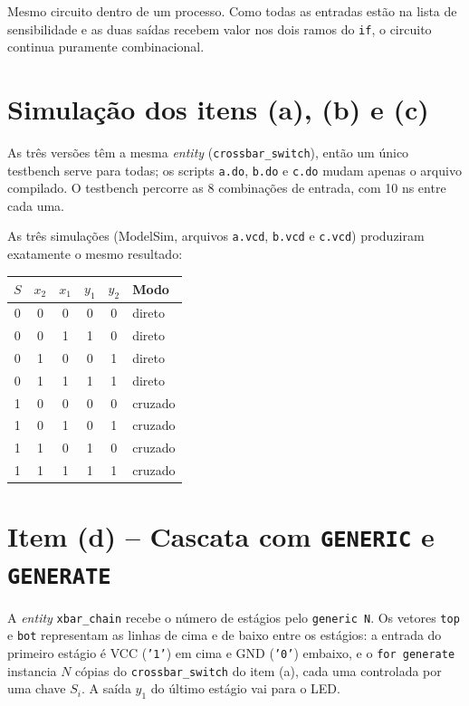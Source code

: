 \documentclass[report, 12pt]{uftreport}
\begin{document}
Mesmo circuito dentro de um processo. Como todas as entradas estão na lista de sensibilidade e as duas saídas recebem valor nos dois ramos do \texttt{if}, o circuito continua puramente combinacional.



\section{Simulação dos itens (a), (b) e (c)}

As três versões têm a mesma \textit{entity} (\texttt{crossbar\_switch}), então um único testbench serve para todas; os scripts \texttt{a.do}, \texttt{b.do} e \texttt{c.do} mudam apenas o arquivo compilado. O testbench percorre as 8 combinações de entrada, com 10 ns entre cada uma.



As três simulações (ModelSim, arquivos \texttt{a.vcd}, \texttt{b.vcd} e \texttt{c.vcd}) produziram exatamente o mesmo resultado:

\begin{center}
\begin{tabular}{ccc|cc|l}
\toprule
$S$ & $x_2$ & $x_1$ & $y_1$ & $y_2$ & Modo \\
\midrule
0 & 0 & 0 & 0 & 0 & direto \\
0 & 0 & 1 & 1 & 0 & direto \\
0 & 1 & 0 & 0 & 1 & direto \\
0 & 1 & 1 & 1 & 1 & direto \\
1 & 0 & 0 & 0 & 0 & cruzado \\
1 & 0 & 1 & 0 & 1 & cruzado \\
1 & 1 & 0 & 1 & 0 & cruzado \\
1 & 1 & 1 & 1 & 1 & cruzado \\
\bottomrule
\end{tabular}
\end{center}

\section{Item (d) -- Cascata com \texttt{GENERIC} e \texttt{GENERATE}}

A \textit{entity} \texttt{xbar\_chain} recebe o número de estágios pelo \texttt{generic N}. Os vetores \texttt{top} e \texttt{bot} representam as linhas de cima e de baixo entre os estágios: a entrada do primeiro estágio é VCC (\texttt{'1'}) em cima e GND (\texttt{'0'}) embaixo, e o \texttt{for generate} instancia $N$ cópias do \texttt{crossbar\_switch} do item (a), cada uma controlada por uma chave $S_i$. A saída $y_1$ do último estágio vai para o LED.
\end{document}
